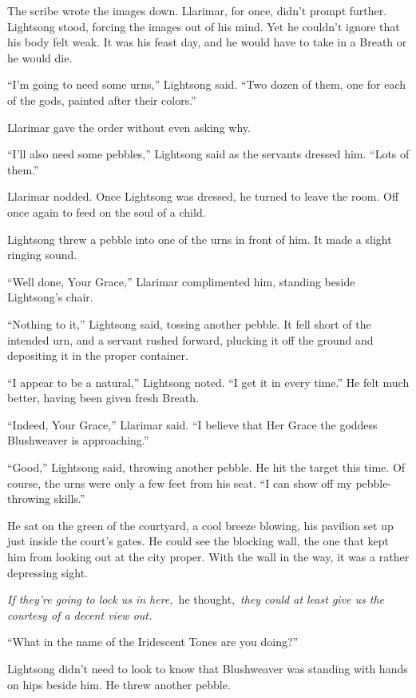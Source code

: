 The scribe wrote the images down. Llarimar, for once, didn’t prompt further. Lightsong stood, forcing the images out of his mind. Yet he couldn’t ignore that his body felt weak. It was his feast day, and he would have to take in a Breath or he would die.

“I’m going to need some urns,” Lightsong said. “Two dozen of them, one for each of the gods, painted after their colors.”

Llarimar gave the order without even asking why.

“I’ll also need some pebbles,” Lightsong said as the servants dressed him. “Lots of them.”

Llarimar nodded. Once Lightsong was dressed, he turned to leave the room. Off once again to feed on the soul of a child.

\orn

Lightsong threw a pebble into one of the urns in front of him. It made a slight ringing sound.

“Well done, Your Grace,” Llarimar complimented him, standing beside Lightsong’s chair.

“Nothing to it,” Lightsong said, tossing another pebble. It fell short of the intended urn, and a servant rushed forward, plucking it off the ground and depositing it in the proper container.

“I appear to be a natural,” Lightsong noted. “I get it in every time.” He felt much better, having been given fresh Breath.

“Indeed, Your Grace,” Llarimar said. “I believe that Her Grace the goddess Blushweaver is approaching.”

“Good,” Lightsong said, throwing another pebble. He hit the target this time. Of course, the urns were only a few feet from his seat. “I can show off my pebble-throwing skills.”

He sat on the green of the courtyard, a cool breeze blowing, his pavilion set up just inside the court’s gates. He could see the blocking wall, the one that kept him from looking out at the city proper. With the wall in the way, it was a rather depressing sight.

\textit{If they’re going to lock us in here,}~he thought,~\textit{they could at least give us the courtesy of a decent view out.}

“What in the name of the Iridescent Tones are you doing?”

Lightsong didn’t need to look to know that Blushweaver was standing with hands on hips beside him. He threw another pebble.

